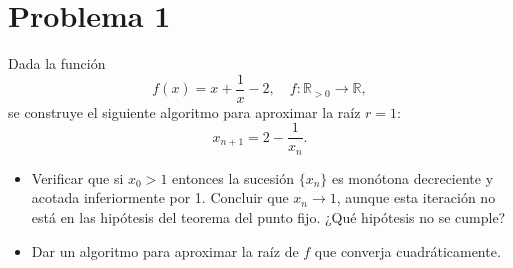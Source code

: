 
\section{Problema 1}
Dada la función
\[
f(x) = x + \frac{1}{x} - 2, \quad f: \mathbb{R}_{>0} \to \mathbb{R},
\]
se construye el siguiente algoritmo para aproximar la raíz $r = 1$:
\[
x_{n+1} = 2 - \frac{1}{x_n}.
\]

\begin{itemize}
    \item Verificar que si $x_0 > 1$ entonces la sucesión $\{x_n\}$ es monótona decreciente y acotada inferiormente por 1. Concluir que $x_n \to 1$, aunque esta iteración no está en las hipótesis del teorema del punto fijo. ¿Qué hipótesis no se cumple?
    \item Dar un algoritmo para aproximar la raíz de $f$ que converja cuadráticamente.
\end{itemize}
